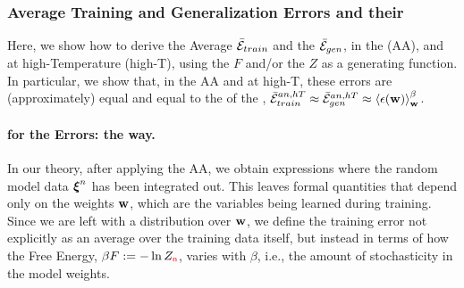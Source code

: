 \subsubsection{Average Training and Generalization Errors and their \GeneratingFunctions}
\label{sxn:mathP_errors}


Here, we show how to derive the Average \TrainingError $\bar{\mathcal{E}}_{train}$ and  the \AverageGeneralizationError $\bar{\mathcal{E}}_{gen}$,
in the \AnnealedApproximation (AA), and at high-Temperature (high-T), using the \FreeEnergy $F$ and/or the \PartitionFunction $Z$ as
a generating function.  
In particular, we show that, in the AA and at high-T, these errors are (approximately) equal
and equal to the \ThermalAverage of the \EffectivePotential,
$\bar{\mathcal{E}}_{train}^{an, hT} \approx \bar{\mathcal{E}}_{gen}^{an, hT} \approx \left\langle \epsilon({\mathbf{w}}) \right\rangle_{\mathbf w}^{\beta}$.


\paragraph{\GeneratingFunctions for the Errors: the \STATMECH way.}
In our theory, after applying the AA, we obtain expressions where the random model data $\boldsymbol{\xi}^{n}$ has been integrated out. This leaves formal quantities that depend only on the weights ${\mathbf{w}}$, which are the variables being learned during training.
Since we are left with a distribution over ${\mathbf{w}}$, we define the training error not explicitly as an average over the training data itself, but instead in terms of how the Free Energy, $\beta F :=-\ln Z_{{\color{red}\sf{n}}}$, varies with $\beta$, i.e., the amount of stochasticity in the model weights.

